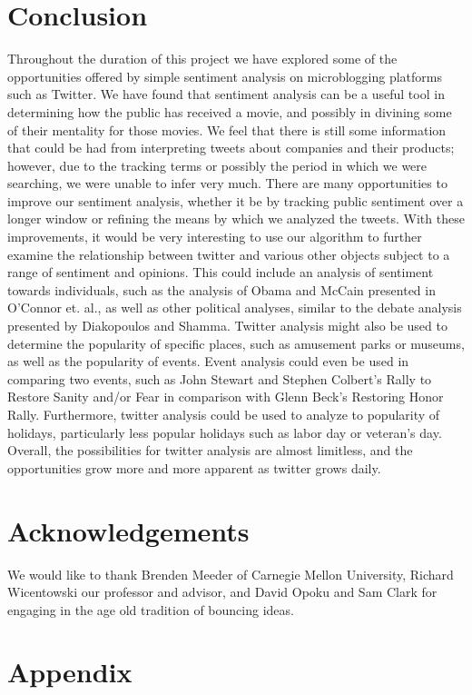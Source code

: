 \documentclass[11pt]{article}
\begin{document}
\section{Conclusion}
Throughout the duration of this project we have explored some of the opportunities offered by simple sentiment analysis on microblogging platforms such as Twitter. We have found that sentiment analysis can be a useful tool in determining how the public has received a movie, and possibly in divining some of their mentality for those movies. We feel that there is still some information that could be had from interpreting tweets about companies and their products; however, due to the tracking terms or possibly the period in which we were searching, we were unable to infer very much. There are many opportunities to improve our sentiment analysis, whether it be by tracking public sentiment over a longer window or refining the means by which we analyzed the tweets.  With these improvements, it would be very interesting to use our algorithm to further examine the relationship  between twitter and various other objects subject to a range of sentiment and opinions.  This could include an analysis of sentiment towards individuals, such as the analysis of Obama and McCain presented in O'Connor et. al., as well as other political analyses, similar to the debate analysis presented by Diakopoulos and Shamma.\cite{oconnor-2010}\cite{diakopoulos-2010}  Twitter analysis might also be used to determine the popularity of specific places, such as amusement parks or museums, as well as the popularity of events.  Event analysis could even be used in comparing two events, such as John Stewart and Stephen Colbert's Rally to Restore Sanity and/or Fear in comparison with Glenn Beck's Restoring Honor Rally.  Furthermore, twitter analysis could be used to analyze to popularity of holidays, particularly less popular holidays such as labor day or veteran's day.  Overall, the possibilities for twitter analysis are almost limitless, and the opportunities grow more and more apparent as twitter grows daily.
\section{Acknowledgements}
We would like to thank Brenden Meeder of Carnegie Mellon University, Richard Wicentowski our professor and advisor, and David Opoku and Sam Clark for engaging in the age old tradition of bouncing ideas.
\section{Appendix}
\end{document}
